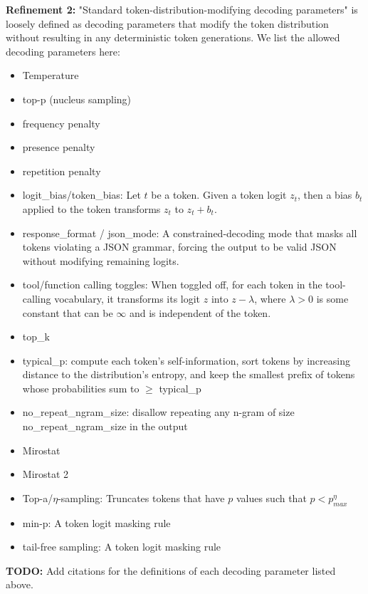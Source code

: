 \documentclass{article}
\begin{document}
\textbf{Refinement 2:} "Standard token-distribution-modifying decoding parameters" is loosely defined as decoding parameters that modify the token distribution without resulting in any deterministic token generations. We list the allowed decoding parameters here:
\begin{itemize}
\item Temperature
\item top-p (nucleus sampling)
\item frequency penalty
\item presence penalty
\item repetition penalty
\item logit\_bias/token\_bias: Let $\displaystyle t$ be a token. Given a token logit $\displaystyle z_{t}$, then a bias $\displaystyle b_{t}$ applied to the token transforms $\displaystyle z_{t}$ to $\displaystyle z_{t} +b_{t}$.
\item response\_format / json\_mode: A constrained-decoding mode that masks all tokens violating a JSON grammar, forcing the output to be valid JSON without modifying remaining logits.
\item tool/function calling toggles: When toggled off, for each token in the tool-calling vocabulary, it transforms its logit $\displaystyle z$ into $\displaystyle z-\lambda $, where $\displaystyle \lambda  >0$ is some constant that can be $\displaystyle \infty $ and is independent of the token.
\item top\_k
\item typical\_p: compute each token's self-information, sort tokens by increasing distance to the distribution's entropy, and keep the smallest prefix of tokens whose probabilities sum to $\geqslant$ typical\_p
\item no\_repeat\_ngram\_size: disallow repeating any n-gram of size no\_repeat\_ngram\_size in the output
\item Mirostat
\item Mirostat 2
\item Top-a/$\displaystyle \eta $-sampling: Truncates tokens that have $\displaystyle p$ values such that $\displaystyle p< p_{max}^{\eta }$
\item min-p: A token logit masking rule
\item tail-free sampling: A token logit masking rule
\end{itemize}



\textbf{TODO:} Add citations for the definitions of each decoding parameter listed above.
\end{document}
